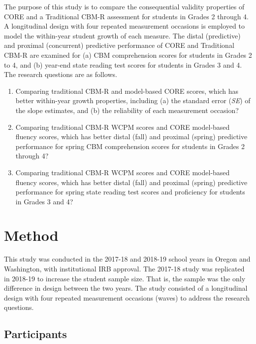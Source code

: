 \documentclass[
  english,
  man, fleqn, noextraspace]{apa6}
\begin{document}
The purpose of this study is to compare the consequential validity properties of CORE and a Traditional CBM-R assessment for students in Grades 2 through 4. A longitudinal design with four repeated measurement occasions is employed to model the within-year student growth of each measure. The distal (predictive) and proximal (concurrent) predictive performance of CORE and Traditional CBM-R are examined for (a) CBM comprehension scores for students in Grades 2 to 4, and (b) year-end state reading test scores for students in Grades 3 and 4. The research questions are as follows.

\begin{enumerate}
\def\labelenumi{(\arabic{enumi})}
\item
  Comparing traditional CBM-R and model-based CORE scores, which has better within-year growth properties, including (a) the standard error (\emph{SE}) of the slope estimates, and (b) the reliability of each measurement occasion?
\item
  Comparing traditional CBM-R WCPM scores and CORE model-based fluency scores, which has better distal (fall) and proximal (spring) predictive performance for spring CBM comprehension scores for students in Grades 2 through 4?
\item
  Comparing traditional CBM-R WCPM scores and CORE model-based fluency scores, which has better distal (fall) and proximal (spring) predictive performance for spring state reading test scores and proficiency for students in Grades 3 and 4?
\end{enumerate}

\hypertarget{method}{%
\section{Method}\label{method}}

This study was conducted in the 2017-18 and 2018-19 school years in Oregon and Washington, with institutional IRB approval. The 2017-18 study was replicated in 2018-19 to increase the student sample size. That is, the sample was the only difference in design between the two years. The study consisted of a longitudinal design with four repeated measurement occasions (waves) to address the research questions.

\hypertarget{participants}{%
\subsection{Participants}\label{participants}}
\end{document}

